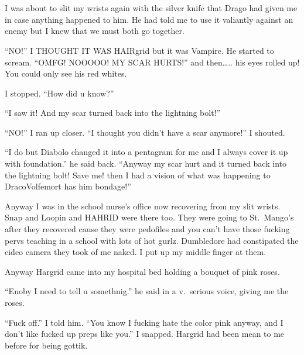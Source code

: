 \section{\chaptername~\thesection}



I was about to slit my wrists again with the silver knife that Drago had given me in case anything happened to him. He had told me to use it valiantly against an enemy but I knew that we must both go together.

\enquote{NO\@!} I THOUGHT IT WAS HAIRgrid but it was Vampire. He started to scream. \enquote{OMFG\@! NOOOOO\@! MY SCAR HURTS\@!} and then….. his eyes rolled up! You could only see his red whites.

I stopped. \enquote{How did u know?}

\enquote{I saw it! And my scar turned back into the lightning bolt!}

\enquote{NO\@!} I ran up closer. \enquote{I thought you didn't have a scar anymore!} I shouted.

\enquote{I do but Diabolo changed it into a pentagram for me and I always cover it up with foundation.} he said back. \enquote{Anyway my scar hurt and it turned back into the lightning bolt! Save me! then I had a vision of what was happening to Draco\dotfill Volfemort has him bondage!}

Anyway I was in the school nurse's office now recovering from my slit wrists. Snap and Loopin and HAHRID were there too. They were going to St.~Mango's after they recovered cause they were pedofiles and you can't have those fucking pervs teaching in a school with lots of hot gurlz. Dumbledore had constipated the cideo camera they took of me naked. I put up my middle finger at them.

Anyway Hargrid came into my hospital bed holding a bouquet of pink roses.

\enquote{Enoby I need to tell u somethnig.} he said in a v.\ serious voice, giving me the roses.

\enquote{Fuck off.} I told him. \enquote{You know I fucking hate the color pink anyway, and I don't like fucked up preps like you.} I snapped. Hargrid had been mean to me before for being gottik.

